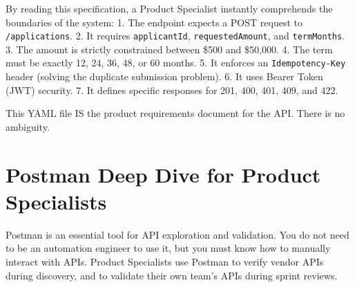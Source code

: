 \begin{Shaded}
\begin{Highlighting}[]
\AttributeTok{        }\KeywordTok{:}
\AttributeTok{          }\KeywordTok{:}
\AttributeTok{        }\KeywordTok{:}
\AttributeTok{          }\KeywordTok{:}
\AttributeTok{          }\KeywordTok{:}
\AttributeTok{    }\KeywordTok{:}
\AttributeTok{      }\KeywordTok{:}
\AttributeTok{      }\KeywordTok{:}
\AttributeTok{        }\KeywordTok{:}
\AttributeTok{          }\KeywordTok{:}
\AttributeTok{        }\KeywordTok{:}
\AttributeTok{          }\KeywordTok{:}
\AttributeTok{        }\KeywordTok{:}
\AttributeTok{          }\KeywordTok{:}
\AttributeTok{          }\KeywordTok{:}
\AttributeTok{            }\KeywordTok{:}
\end{Highlighting}
\end{Shaded}

By reading this specification, a Product Specialist instantly
comprehends the boundaries of the system: 1. The endpoint expects a POST
request to \texttt{/applications}. 2. It requires \texttt{applicantId},
\texttt{requestedAmount}, and \texttt{termMonths}. 3. The amount is
strictly constrained between \$500 and \$50,000. 4. The term must be
exactly 12, 24, 36, 48, or 60 months. 5. It enforces an
\texttt{Idempotency-Key} header (solving the duplicate submission
problem). 6. It uses Bearer Token (JWT) security. 7. It defines specific
responses for 201, 400, 401, 409, and 422.

This YAML file IS the product requirements document for the API. There
is no ambiguity.

\section{Postman Deep Dive for Product
Specialists}\label{postman-deep-dive-for-product-specialists}

Postman is an essential tool for API exploration and validation. You do
not need to be an automation engineer to use it, but you must know how
to manually interact with APIs. Product Specialists use Postman to
verify vendor APIs during discovery, and to validate their own team's
APIs during sprint reviews.

